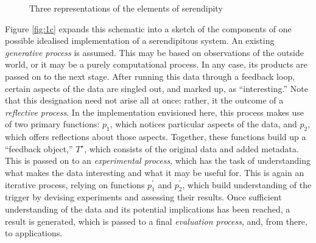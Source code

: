 \afterpage{\clearpage}
\begin{figure}[p]
\vspace{2mm}
\begin{minipage}[b]{\textwidth}
{\centering


\par}
\vspace{-4mm}
\label{fig:1a}
\end{minipage}
\medskip

\begin{minipage}[b]{\textwidth}
{\centering

\par}
\label{fig:1b}
\end{minipage}
\medskip

\begin{minipage}[b]{\textwidth}
{\centering


\par}
\smallskip

\label{fig:1c}
\end{minipage}
\bigskip

\caption{Three representations of the elements of serendipity}\label{fig:model}
\end{figure}

Figure \ref{fig:1c} expands this schematic into a sketch of the
components of one possible idealised implementation of a serendipitous
system.  An existing \emph{generative process} is assumed.  This may
be based on observations of the outside world, or it may be a purely
computational process.  In any case, its products are passed on to the
next stage.  After running this data through a feedback loop, certain
aspects of the data are singled out, and marked up, as
``interesting.''  Note that this designation need not arise all at
once: rather, it the outcome of a \emph{reflective process}.  In the
implementation envisioned here, this process makes use of two primary
functions: $p_1$, which notices particular aspects of the data, and $p_2$, which
offers reflections about those aspects.  Together, these functions build up a
``feedback object,'' $T^{\star}$, which consists of the original data
and added metadata.  This is passed on to an \emph{experimental
  process}, which has the task of understanding what makes the data
interesting and what it may be useful for.  This is again an iterative
process, relying on functions $p^{\prime}_1$ and $p^{\prime}_2$, which
build understanding of the trigger by devising experiments and
assessing their results.  Once sufficient understanding of the data
and its potential implications has been reached, a result is
generated, which is passed to a final \emph{evaluation process}, and,
from there, to applications.

